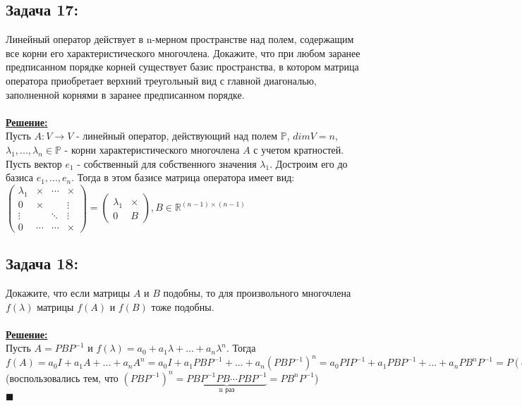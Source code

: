 \documentclass[a4paper,12pt,titlepage,final]{article}
\begin{document}
\subsection*{Задача 17:}
\noindent Линейный оператор действует в n-мерном пространстве над полем, содержащим все корни его
характеристического многочлена. Докажите, что при любом заранее предписанном порядке
корней существует базис пространства, в котором матрица оператора приобретает верхний
треугольный вид с главной диагональю, заполненной корнями в заранее предписанном порядке. \\ \\
\textbf{\underline{Решение:}} \\
Пусть $A: V \rightarrow V$ - линейный оператор, действующий над полем $\mathbb{P}$, $dimV = n$, 
$\lambda_1, ... , \lambda_n \in \mathbb{P}$ - корни характеристического многочлена $A$ с учетом кратностей. \\
Пусть вектор $e_1$ - собственный для собственного значения $\lambda_1$. Достроим его до базиса 
$e_1, ... , e_n$. Тогда в этом базисе матрица оператора имеет вид: \\
$
\begin{pmatrix}
    \lambda_1 & \times & \cdots & \times \\
    0 & \times & & \vdots \\
    \vdots & & \ddots & \vdots \\
    0 & \cdots & \cdots & \times
\end{pmatrix} = 
\begin{pmatrix}
    \lambda_1 & \times \\
    0 & B
\end{pmatrix}, B \in \mathbb{R}^{(n - 1) \times (n - 1)}$ \\


\subsection*{Задача 18:}
\noindent Докажите, что если матрицы $A$ и $B$ подобны, то для произвольного многочлена $f(\lambda)$ матрицы
$f(A)$ и $f(B)$ тоже подобны. \\ \\
\textbf{\underline{Решение:}} \\
Пусть $A = PBP^{-1}$ и $f(\lambda) = a_0 + a_1 \lambda + ... + a_n \lambda^n$.
Тогда $f(A) = a_0I + a_1A + ... + a_nA^n = a_0I + a_1PBP^{-1} + ... + a_n(PBP^{-1})^n =
a_0PIP^{-1} + a_1PBP^{-1} + ... + a_nPB^nP^{-1} = P(a_0I + a_1B + ... + a_nB^n)P^{-1} = Pf(B)P^{-1}$ 
(воспользовались тем, что $(PBP^{-1})^n = \underbrace{PBP^{-1}PB \cdots PBP^{-1}}_{\text{n раз}} = PB^nP^{-1}$)\\ $\blacksquare$ \\ \\ \\
\end{document}
